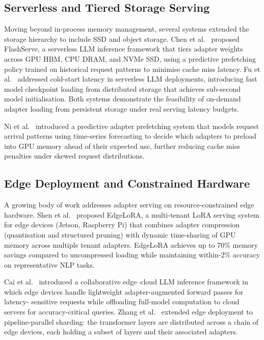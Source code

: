 \subsection{Serverless and Tiered Storage Serving}
\label{sec:inference_systems:serverless}

Moving beyond in-process memory management, several systems extended the storage
hierarchy to include SSD and object storage. Chen et al.~\cite{ChenFlashServe2025} proposed
FlashServe, a serverless LLM inference framework that tiers adapter weights across GPU
HBM, CPU DRAM, and NVMe SSD, using a predictive prefetching policy trained on
historical request patterns to minimise cache miss latency. Fu et al.~\cite{FuServerlessLLM2024}
addressed cold-start latency in serverless LLM deployments, introducing fast model
checkpoint loading from distributed storage that achieves sub-second model initialisation.
Both systems demonstrate the feasibility of on-demand adapter loading from persistent
storage under real serving latency budgets.

Ni et al.~\cite{NiPredictive2025} introduced a predictive adapter prefetching system that models
request arrival patterns using time-series forecasting to decide which adapters to
preload into GPU memory ahead of their expected use, further reducing cache miss
penalties under skewed request distributions.

\subsection{Edge Deployment and Constrained Hardware}
\label{sec:inference_systems:edge}

A growing body of work addresses adapter serving on resource-constrained edge hardware.
Shen et al.~\cite{Shen2025EdgeLoRA} proposed EdgeLoRA, a multi-tenant LoRA serving system for edge
devices (Jetson, Raspberry Pi) that combines adapter compression (quantisation and
structured pruning) with dynamic time-sharing of GPU memory across multiple tenant
adapters. EdgeLoRA achieves up to 70\% memory savings compared to uncompressed loading
while maintaining within-2\% accuracy on representative NLP tasks.

Cai et al.~\cite{CaiEdgeLLM2024} introduced a collaborative edge--cloud LLM inference framework
in which edge devices handle lightweight adapter-augmented forward passes for latency-
sensitive requests while offloading full-model computation to cloud servers for
accuracy-critical queries. Zhang et al.~\cite{ZhangEdgeShard2025} extended edge deployment to
pipeline-parallel sharding: the transformer layers are distributed across a chain of
edge devices, each holding a subset of layers and their associated adapters.

